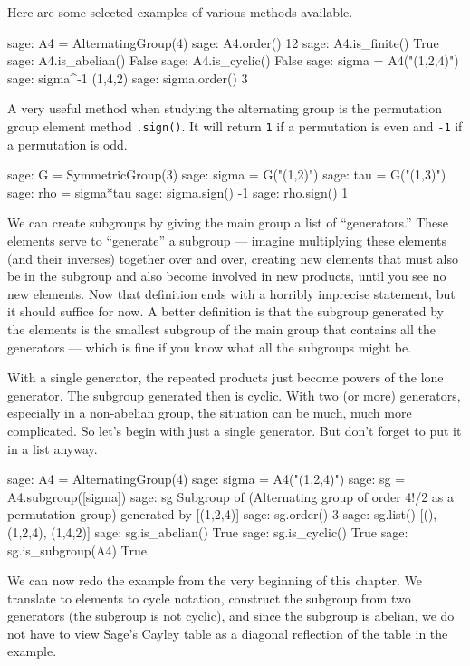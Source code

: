 %
\begin{sageverbatim}
\end{sageverbatim}
%
Here are some selected examples of various methods available.
%
\begin{sageexample}
sage: A4 = AlternatingGroup(4)
sage: A4.order()
12
sage: A4.is_finite()
True
sage: A4.is_abelian()
False
sage: A4.is_cyclic()
False
sage: sigma = A4("(1,2,4)")
sage: sigma^-1
(1,4,2)
sage: sigma.order()
3
\end{sageexample}
%
A very useful method when studying the alternating group is the permutation group element method \verb?.sign()?.  It will return \verb?1? if a permutation is even and \verb?-1? if a permutation is odd.
%
\begin{sageexample}
sage: G = SymmetricGroup(3)
sage: sigma = G("(1,2)")
sage: tau = G("(1,3)")
sage: rho = sigma*tau
sage: sigma.sign()
-1
sage: rho.sign()
1
\end{sageexample}
%
We can create subgroups by giving the main group a list of ``generators.''  These elements serve to ``generate'' a subgroup --- imagine multiplying these elements (and their inverses) together over and over, creating new elements that must also be in the subgroup and also become involved in new products, until you see no new elements.  Now that definition ends with a horribly imprecise statement, but it should suffice for now.  A better definition is that the subgroup generated by the elements is the smallest subgroup of the main group that contains all the generators --- which is fine if you know what all the subgroups might be.\par
%
With a single generator, the repeated products just become powers of the lone generator.  The subgroup generated then is cyclic.  With two (or more) generators, especially in a non-abelian group, the situation can be much, much more complicated.  So let's begin with just a single generator.  But don't forget to put it in a list anyway.
%
\begin{sageexample}
sage: A4 = AlternatingGroup(4)
sage: sigma = A4("(1,2,4)")
sage: sg = A4.subgroup([sigma])
sage: sg
Subgroup of (Alternating group of order 4!/2 as a permutation group) 
generated by [(1,2,4)]
sage: sg.order()
3
sage: sg.list()
[(), (1,2,4), (1,4,2)]
sage: sg.is_abelian()
True
sage: sg.is_cyclic()
True
sage: sg.is_subgroup(A4)
True
\end{sageexample}
%
We can now redo the example from the very beginning of this chapter.  We translate to elements to cycle notation, construct the subgroup from two generators (the subgroup is not cyclic), and since the subgroup is abelian, we do not have to view Sage's Cayley table as a diagonal reflection of the table in the example.

